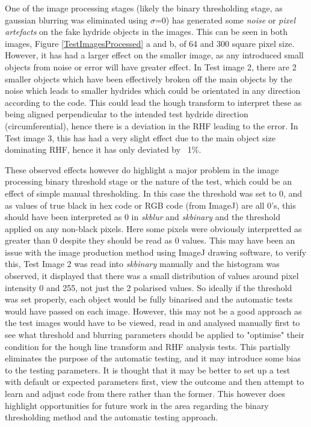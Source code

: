 \documentclass{article}
\begin{document}
One of the image processing stages (likely the binary thresholding stage, as gaussian blurring was eliminated using $\sigma$=0) has generated some \textit{noise} or \textit{pixel artefacts} on the fake hydride objects in the images. This can be seen in both images, Figure \ref{TestImagesProcessed} a and b, of 64 and 300 square pixel size. However, it has had a larger effect on the smaller image, as any introduced small objects from noise or error will have greater effect. In Test image 2, there are 2 smaller objects which have been effectively broken off the main objects by the noise which leads to smaller hydrides which could be orientated in any direction according to the code. This could lead the hough transform to interpret these as being aligned perpendicular to the intended test hydride direction (circumferential), hence there is a deviation in the RHF leading to the error. In Test image 3, this has had a very slight effect due to the main object size dominating RHF, hence it has only deviated by ~1\%. 

These observed effects however do highlight a major problem in the image processing binary threshold stage or the nature of the test, which could be an effect of simple manual thresholding. In this case the threshold was set to 0, and as values of true black in hex code or RGB code (from ImageJ) are all 0's, this should have been interpreted as 0 in \textit{skblur} and \textit{skbinary} and the threshold applied on any non-black pixels. Here some pixels were obviously interpretted as greater than 0 despite they should be read as 0 values. This may have been an issue with the image production method using ImageJ drawing software, to verify this, Test Image 2 was read into \textit{skbinary} manually and the histogram was observed, it displayed that there was a small distribution of values around pixel intensity 0 and 255, not just the 2 polarised values. So ideally if the threshold was set properly, each object would be fully binarised and the automatic tests would have passed on each image. However, this may not be a good approach as the test images would have to be viewed, read in and analysed manually first to see what threshold and blurring parameters should be applied to "optimise" their condition for the hough line transform and RHF analysis tests. This partially eliminates the purpose of the automatic testing, and it may introduce some bias to the testing parameters. It is thought that it may be better to set up a test with default or expected parameters first, view the outcome and then attempt to learn and adjust code from there rather than the former. This however does highlight opportunities for future work in the area regarding the binary thresholding method and the automatic testing approach.
\end{document}
